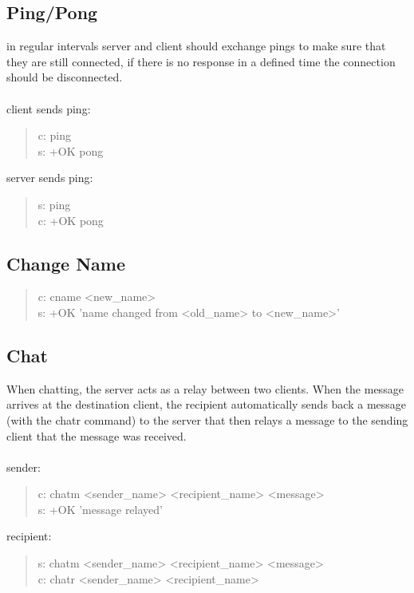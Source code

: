 \documentclass[a4paper,11pt]{article}
\begin{document}
\subsection{Ping/Pong}
in regular intervals server and client should exchange pings to make sure that they are still connected, if there is no response in a defined time the connection should be disconnected.\\\\
client sends ping:
\begin{quote}
  c: ping\\
  s: +OK pong
\end{quote}
\noindent
server sends ping:
\begin{quote}
  s: ping\\
  c: +OK pong
\end{quote}


\subsection{Change Name}

\begin{quote}
  c: cname <new\_name>\\
  s: +OK 'name changed from <old\_name> to <new\_name>'
\end{quote}


\subsection{Chat}
When chatting, the server acts as a relay between two clients. When the message arrives at the destination client, the recipient automatically sends back a message (with the chatr command) to the server that then relays a message to the sending client that the message was received.\\\\
sender:
\begin{quote}
  c: chatm <sender\_name> <recipient\_name> <message>\\ %
  s: +OK 'message relayed'
\end{quote}
\noindent
recipient:
\begin{quote}
    s: chatm <sender\_name> <recipient\_name> <message>\\
  c: chatr <sender\_name> <recipient\_name>%
\end{quote}
\clearpage
\end{document}

